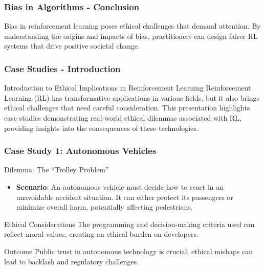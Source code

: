 \documentclass[aspectratio=169]{beamer}
\begin{document}
\begin{frame}[fragile]
  \frametitle{Bias in Algorithms - Conclusion}
  
  Bias in reinforcement learning poses ethical challenges that demand attention. By understanding the origins and impacts of bias, practitioners can design fairer RL systems that drive positive societal change.
  
\end{frame}

\begin{frame}[fragile]
    \frametitle{Case Studies - Introduction}
    \begin{block}{Introduction to Ethical Implications in Reinforcement Learning}
        Reinforcement Learning (RL) has transformative applications in various fields, but it also brings ethical challenges that need careful consideration. 
        This presentation highlights case studies demonstrating real-world ethical dilemmas associated with RL, providing insights into the consequences of these technologies.
    \end{block}
\end{frame}

\begin{frame}[fragile]
    \frametitle{Case Study 1: Autonomous Vehicles}
    \begin{block}{Dilemma: The ``Trolley Problem''}
        \begin{itemize}
            \item \textbf{Scenario}: An autonomous vehicle must decide how to react in an unavoidable accident situation. It can either protect its passengers or minimize overall harm, potentially affecting pedestrians.
        \end{itemize}
    \end{block}
    
    \begin{block}{Ethical Considerations}
        The programming and decision-making criteria used can reflect moral values, creating an ethical burden on developers.
    \end{block}
    
    \begin{block}{Outcome}
        Public trust in autonomous technology is crucial; ethical mishaps can lead to backlash and regulatory challenges.
    \end{block}
\end{frame}
\end{document}
